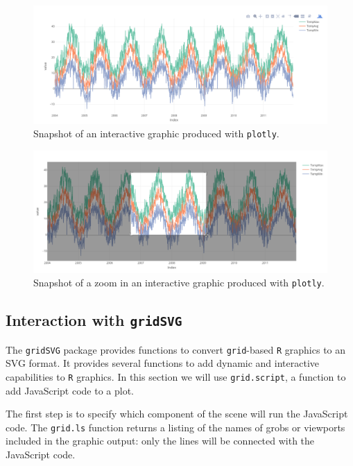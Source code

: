 \documentclass[smallroyalvopaper]{memoir}
\begin{document}
\begin{figure}[htbp]
\centering
\includegraphics[width=.9\linewidth]{figs/plotly_aranjuez.png}
\caption{Snapshot of an interactive graphic produced with \texttt{plotly}. \label{fig:plotly}}
\end{figure}

\begin{figure}[htbp]
\centering
\includegraphics[width=.9\linewidth]{figs/plotly_aranjuez_zoom.png}
\caption{Snapshot of a zoom in an interactive graphic produced with \texttt{plotly}. \label{fig:plotly_zoom}}
\end{figure}


\subsection{\floweroneleft Interaction with \texttt{gridSVG}}
\label{sec:org6664283}
The \texttt{gridSVG} package provides functions to convert \texttt{grid}-based \texttt{R}
graphics to an SVG format. It provides several functions to add
dynamic and interactive capabilities to \texttt{R} graphics. In this section
we will use \texttt{grid.script}, a function to add JavaScript code to a
plot.

The first step is to specify which component of the scene
will run the JavaScript code. The \texttt{grid.ls} function  returns a
listing of the names of grobs or viewports included in the graphic
output: only the lines will be connected with the JavaScript
code. 

\end{document}

